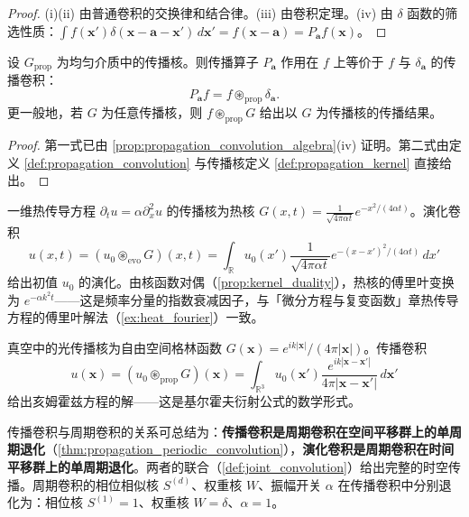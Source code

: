 \begin{proof}
(i)(ii) 由普通卷积的交换律和结合律。(iii) 由卷积定理。(iv) 由 $\delta$ 函数的筛选性质：$\int f(\mathbf{x}')\delta(\mathbf{x}-\mathbf{a}-\mathbf{x}')\,d\mathbf{x}' = f(\mathbf{x}-\mathbf{a}) = P_{\mathbf{a}}f(\mathbf{x})$。
\end{proof}

\begin{theorem}[传播卷积与传播算子的统一]\label{thm:propagation_convolution_operator}
设 $G_{\text{prop}}$ 为均匀介质中的传播核。则传播算子 $P_{\mathbf{a}}$ 作用在 $f$ 上等价于 $f$ 与 $\delta_{\mathbf{a}}$ 的传播卷积：
\[
P_{\mathbf{a}}f = f\circledast_{\text{prop}}\delta_{\mathbf{a}}.
\]
更一般地，若 $G$ 为任意传播核，则 $f\circledast_{\text{prop}}G$ 给出以 $G$ 为传播核的传播结果。
\end{theorem}

\begin{proof}
第一式已由 \cref{prop:propagation_convolution_algebra}(iv) 证明。第二式由定义 \ref{def:propagation_convolution} 与传播核定义 \ref{def:propagation_kernel} 直接给出。
\end{proof}

\begin{example}[热传导的演化卷积]\label{ex:heat_evolution_convolution}
一维热传导方程 $\partial_t u = \alpha\partial_x^2 u$ 的传播核为热核 $G(x,t) = \frac{1}{\sqrt{4\pi\alpha t}}e^{-x^2/(4\alpha t)}$。演化卷积
\[
u(x,t) = (u_0\circledast_{\text{evo}}G)(x,t) = \int_{\mathbb{R}}u_0(x')\frac{1}{\sqrt{4\pi\alpha t}}e^{-(x-x')^2/(4\alpha t)}\,dx'
\]
给出初值 $u_0$ 的演化。由核函数对偶（\cref{prop:kernel_duality}），热核的傅里叶变换为 $e^{-\alpha k^2 t}$——这是频率分量的指数衰减因子，与「微分方程与复变函数」章热传导方程的傅里叶解法（\cref{ex:heat_fourier}）一致。
\end{example}

\begin{example}[自由空间的光传播卷积]\label{ex:free_space_optical_convolution}
真空中的光传播核为自由空间格林函数 $G(\mathbf{x}) = e^{ik|\mathbf{x}|}/(4\pi|\mathbf{x}|)$。传播卷积
\[
u(\mathbf{x}) = (u_0\circledast_{\text{prop}}G)(\mathbf{x}) = \int_{\mathbb{R}^3}u_0(\mathbf{x}')\frac{e^{ik|\mathbf{x}-\mathbf{x}'|}}{4\pi|\mathbf{x}-\mathbf{x}'|}\,d\mathbf{x}'
\]
给出亥姆霍兹方程的解——这是基尔霍夫衍射公式的数学形式。
\end{example}

\begin{remark}[传播卷积与周期卷积的关系摘要]\label{rem:propagation_convolution_summary}
传播卷积与周期卷积的关系可总结为：\textbf{传播卷积是周期卷积在空间平移群上的单周期退化}（\cref{thm:propagation_periodic_convolution}），\textbf{演化卷积是周期卷积在时间平移群上的单周期退化}。两者的联合（\cref{def:joint_convolution}）给出完整的时空传播。周期卷积的相位相似核 $S^{(d)}$、权重核 $W$、振幅开关 $\alpha$ 在传播卷积中分别退化为：相位核 $S^{(1)}=1$、权重核 $W=\delta$、$\alpha=1$。
\end{remark}


